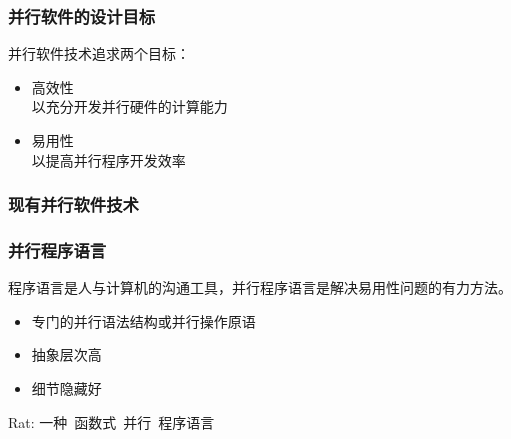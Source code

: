 \documentclass[]{beamer}
\begin{document}

\begin{frame}
  \frametitle{并行软件的设计目标}
  并行软件技术追求两个目标：
  \begin{itemize}
    \item 高效性\\
      以充分开发并行硬件的计算能力
    \item 易用性\\
      以提高并行程序开发效率
  \end{itemize}
\end{frame}

\begin{frame}
  \frametitle{现有并行软件技术}
\end{frame}

\begin{frame}
  \frametitle{并行程序语言}
  程序语言是人与计算机的沟通工具，并行程序语言是解决易用性问题的有力方法。
  \pause
  \begin{itemize}
    \item 专门的并行语法结构或并行操作原语
    \item 抽象层次高
    \item 细节隐藏好
  \end{itemize}
\end{frame}

\begin{frame}                   %
  \centerline{Rat: 一种\ {\huge 函数式\ 并行}\ 程序语言}
\end{frame}
\end{document}
